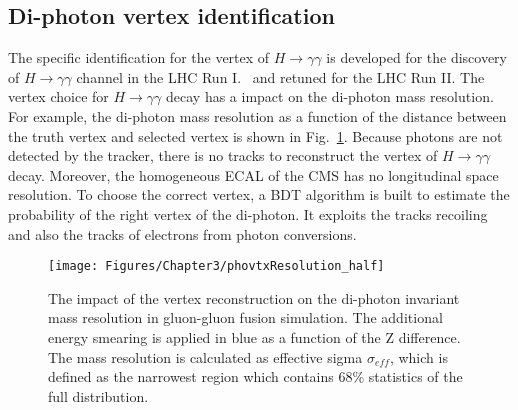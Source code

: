 
\subsection{Di-photon vertex identification}

The specific identification for the vertex of $H \rightarrow \gamma\gamma$ is developed for the discovery of $H \rightarrow \gamma\gamma$ channel in the LHC Run I.~\cite{1202.1487} and retuned for the LHC Run II.
The vertex choice for $H \rightarrow \gamma\gamma$ decay has a impact on the di-photon mass resolution.
For example, the di-photon mass resolution as a function of the distance between the truth vertex and selected vertex is shown in Fig.~\ref{fig:phovtxResolution}.
Because photons are not detected by the tracker, there is no tracks to reconstruct the vertex of $H \rightarrow \gamma\gamma$ decay.
Moreover, the homogeneous ECAL of the CMS has no longitudinal space resolution.
To choose the correct vertex, a BDT algorithm is built to estimate the probability of the right vertex of the di-photon.
It exploits the tracks recoiling and also the tracks of electrons from photon conversions.
\begin{figure}[h]
  \centering
  \texttt{[image: Figures/Chapter3/phovtxResolution\_half]}
  \caption{
	The impact of the vertex reconstruction on the di-photon invariant mass resolution in gluon-gluon fusion \Hgg simulation.
	The additional energy smearing is applied in blue as a function of the Z difference.
	The mass resolution is calculated as effective sigma $\sigma_{eff}$, which is defined as the narrowest region which contains 68\% statistics of the full distribution.
  } %
  \label{fig:phovtxResolution}
\end{figure}

